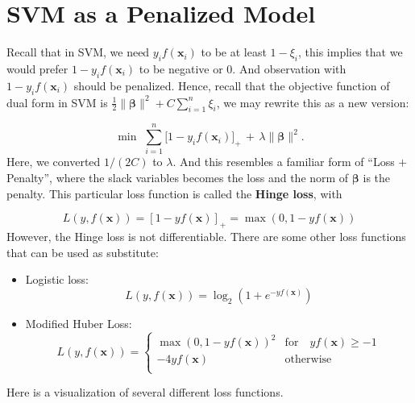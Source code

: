 \documentclass[
]{book}
\providecommand{\tightlist}{%
  \setlength{\itemsep}{0pt}\setlength{\parskip}{0pt}}
\theoremstyle{definition}
\theoremstyle{definition}
\theoremstyle{definition}
\theoremstyle{definition}
\theoremstyle{remark}
\begin{document}
\hypertarget{svm-as-a-penalized-model}{%
\section{SVM as a Penalized Model}\label{svm-as-a-penalized-model}}

Recall that in SVM, we need \(y_i f(\mathbf{x}_i)\) to be at least \(1 - \xi_i\), this implies that we would prefer \(1 - y_i f(\mathbf{x}_i)\) to be negative or 0. And observation with \(1 - y_i f(\mathbf{x}_i)\) should be penalized. Hence, recall that the objective function of dual form in SVM is \(\frac{1}{2}\lVert \boldsymbol \beta\rVert^2 + C \sum_{i=1}^n \xi_i\), we may rewrite this as a new version:

\[\min \,\, \sum_{i=1}^n \big[ 1 - y_i f(\mathbf{x}_i) \big]_{+} \, +\, \lambda \lVert \boldsymbol \beta\rVert^2.\]
Here, we converted \(1/(2C)\) to \(\lambda\). And this resembles a familiar form of ``Loss \(+\) Penalty'', where the slack variables becomes the loss and the norm of \(\boldsymbol \beta\) is the penalty. This particular loss function is called the \textbf{Hinge loss}, with

\[L(y, f(\mathbf{x})) = [1 - yf(\mathbf{x})]_+ = \max(0, 1 - yf(\mathbf{x}))\]
However, the Hinge loss is not differentiable. There are some other loss functions that can be used as substitute:

\begin{itemize}
\tightlist
\item
  Logistic loss:
  \[L(y, f(\mathbf{x})) = \log_2( 1 + e^{-y f(\mathbf{x})})\]
\item
  Modified Huber Loss:
  \[L(y, f(\mathbf{x})) = \begin{cases}
  \max(0, 1 - yf(\mathbf{x}))^2 & \text{for} \quad yf(\mathbf{x}) \geq -1 \\
  -4 yf(\mathbf{x})  & \text{otherwise}  \\
  \end{cases}\]
\end{itemize}

Here is a visualization of several different loss functions.
\end{document}
